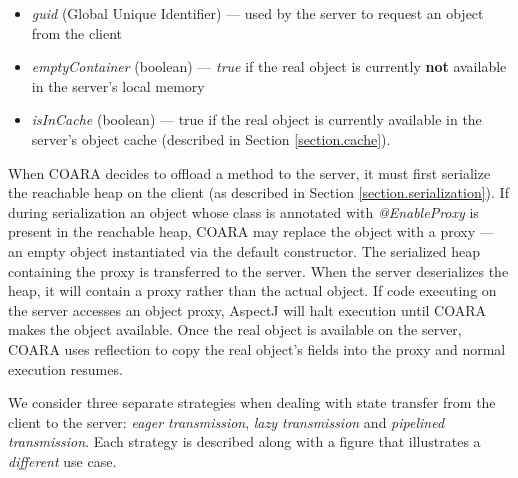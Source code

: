 \documentclass[10pt,journal,cspaper,compsoc]{IEEEtran}
\begin{document}
\begin{itemize}
  \item \emph{guid} (Global Unique Identifier) --- used by the server to request an object from the client
  \item \emph{emptyContainer} (boolean) --- \emph{true} if the real object is currently \textbf{not} available in the server's local memory
  \item \emph{isInCache} (boolean) --- true if the real object is currently available in the server's object cache (described in Section \ref{section.cache}).
\end{itemize}

When COARA decides to offload a method to the server, it must first serialize the reachable heap on the client (as described in Section \ref{section.serialization}).  If during serialization an object whose class is annotated with \emph{@EnableProxy} is present in the reachable heap, COARA may replace the object with a proxy --- an empty object instantiated via the default constructor.   The serialized heap containing the proxy is transferred to the server.  When the server deserializes the heap, it will contain a proxy rather than the actual object.
If code executing on the server accesses an object proxy, AspectJ will halt execution until COARA makes the object available.  Once the real object is available on the server, COARA uses reflection to copy the real object's fields into the proxy and normal execution resumes.

We consider three separate strategies when dealing with state transfer from the client to the server: \emph{eager transmission}, \emph{lazy transmission} and \emph{pipelined transmission}. Each strategy is described along with a figure that illustrates a \emph{different} use case.
\end{document}

